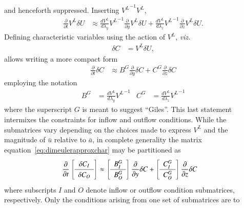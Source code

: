 \documentclass[letterpaper,11pt,nointlimits,reqno,draft]{amsart}
\begin{document}
and henceforth suppressed.  Inserting ${V^L}^{-1} V^L$,
\begin{align}
  \frac{\partial}{\partial{}t}
  V^L
  \delta{}U
  &\approx
  \frac{dV^L}{d\lambda_y}
  {V^L}^{-1}
  \frac{\partial}{\partial{}y}
  V^L
  \delta{}U
  +
  \frac{dV^L}{d\lambda_z}
  {V^L}^{-1}
  \frac{\partial}{\partial{}z}
  V^L
  \delta{}U
.
\end{align}
Defining characteristic variables using the action of $V^L$, \textit{viz.}
\begin{align}
  \delta{}C &= V^L \delta{}U
  ,
\end{align}
allows writing a more compact form
\begin{align}
\label{eq:dimeulerapproxchar}
  \frac{\partial}{\partial{}t}
  \delta{}C
  &\approx
  B^G
  \frac{\partial}{\partial{}y}
  \delta{}C
  +
  C^G
  \frac{\partial}{\partial{}z}
  \delta{}C
\end{align}
employing the notation
\begin{align}
\label{eq:dimeulerapproxBG}
  B^G
&=
  \frac{dV^L}{d\lambda_y}
  {V^L}^{-1}
&
  C^G
&=
  \frac{dV^L}{d\lambda_z}
  {V^L}^{-1}
\end{align}
where the superscript $G$ is meant to suggest ``Giles''.  This last statement
intermixes the constraints for inflow and outflow conditions.  While the
submatrices vary depending on the choices made to express $V^L$ and the
magnitude of $\bar{u}$ relative to $\bar{a}$, in complete generality the matrix
equation~\eqref{eq:dimeulerapproxchar} may be partitioned as
\begin{align}
\label{eq:dimeulerapproxcharpart}
\renewcommand*{\arraystretch}{1.2}
  \frac{\partial}{\partial{}t}
  \left[\begin{array}{c}\delta{}C_{I}\\\hline\delta{}C_{O}\end{array}\right]
  &\approx
\renewcommand*{\arraystretch}{1.2}
  \left[\begin{array}{c} B^G_{I} \\ \hline B^G_{O} \end{array}\right]
  \frac{\partial}{\partial{}y}
  \delta{}C
  +
  \left[\begin{array}{c} C^G_{I} \\ \hline C^G_{O} \end{array}\right]
  \frac{\partial}{\partial{}z}
  \delta{}C
\end{align}
where subscripts $I$ and $O$ denote inflow or outflow condition submatrices,
respectively.  Only the conditions arising from one set of submatrices are to
\end{document}
